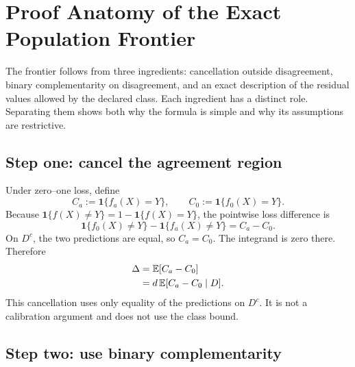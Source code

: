 \section{Proof Anatomy of the Exact Population Frontier}
\label{fr:sec-frontier-anatomy}

The frontier follows from three ingredients: cancellation outside disagreement, binary
complementarity on disagreement, and an exact description of the residual values allowed by the
declared class.  Each ingredient has a distinct role.  Separating them shows both why the formula is
simple and why its assumptions are restrictive.

\subsection{Step one: cancel the agreement region}
\label{fr:subsec-cancel-agreement}

Under zero--one loss, define
\begin{equation}
  C_a:=\mathbf 1\{f_a(X)=Y\},
  \qquad
  C_0:=\mathbf 1\{f_0(X)=Y\}.
  \label{fr:eq-correctness-indicators}
\end{equation}
Because $\mathbf 1\{f(X)\ne Y\}=1-\mathbf 1\{f(X)=Y\}$, the pointwise loss difference is
\begin{equation}
  \mathbf 1\{f_0(X)\ne Y\}-\mathbf 1\{f_a(X)\ne Y\}
  =C_a-C_0.
  \label{fr:eq-loss-correctness-difference}
\end{equation}
On $D^c$, the two predictions are equal, so $C_a=C_0$.  The integrand is zero there.  Therefore
\begin{align}
  \Delta
  &=\mathbb{E}[C_a-C_0] \\
  &=d\,\mathbb{E}[C_a-C_0\mid D].
  \label{fr:eq-disagreement-reduction-one}
\end{align}
This cancellation uses only equality of the predictions on $D^c$.  It is not a calibration
argument and does not use the class bound.

\subsection{Step two: use binary complementarity}
\label{fr:subsec-binary-complementarity}

